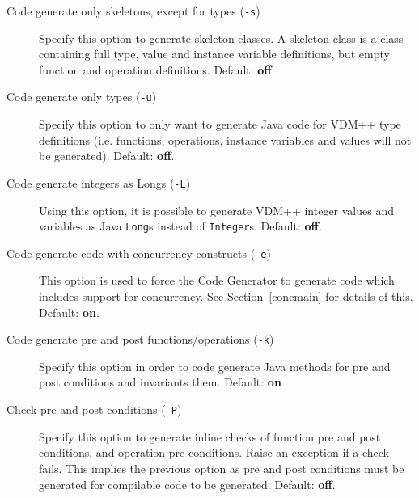 \documentclass[\pformat,11pt]{article}
\begin{document}
\begin{description}
\item [Code generate only skeletons, except for types ({\tt -s})] 
  Specify this  option to
  generate skeleton classes. A skeleton class is a 
  class containing full type, value and instance variable definitions,
  but empty function and operation definitions.  Default: \textbf{off}
\item [Code generate only types ({\tt -u})] 
  Specify this
  option to only want to generate Java code for VDM++ type
  definitions (i.e. functions, operations, instance variables and
  values will not be generated). Default: \textbf{off}.%
\item [Code generate integers as Longs (\texttt{-L})]
  Using this
  option, it is possible to generate VDM++ integer values and
  variables as Java \texttt{Long}s instead of
  \texttt{Integer}s. Default: \textbf{off}.
\item [Code generate code with concurrency constructs (\texttt{-e})]
  This option is used to force the Code Generator to generate code
  which includes support for concurrency. See Section~\ref{concmain}
  for details of this. Default: \textbf{on}.
\item [Code generate pre and post functions/operations (\texttt{-k})] 
  Specify this option
  in order to code generate Java methods for pre and post conditions
  and invariants them. Default: \textbf{on}%
\item [Check pre and post conditions (\texttt{-P})] 
  Specify this option to generate inline checks of function pre and post
  conditions, and operation pre conditions. Raise an exception if a
  check fails. This implies the
  previous option as pre and post conditions must be generated for
  compilable code to be generated. Default: \textbf{off}.%

\end{description}
\end{document}
